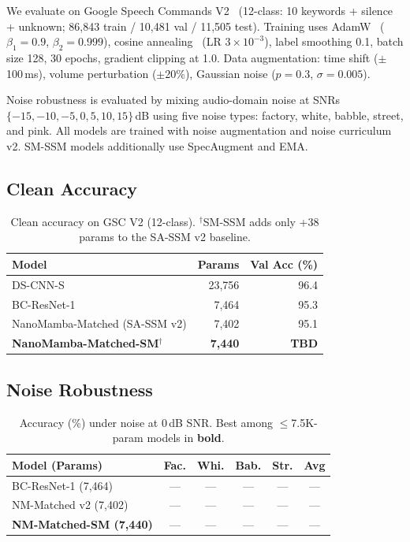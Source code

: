 \documentclass{Interspeech}
\begin{document}
We evaluate on Google Speech Commands V2~\cite{warden2018speech} (12-class: 10 keywords + silence + unknown; 86,843 train / 10,481 val / 11,505 test).
Training uses AdamW~\cite{loshchilov2019adamw} ($\beta_1{=}0.9$, $\beta_2{=}0.999$), cosine annealing~\cite{loshchilov2017sgdr} (LR $3{\times}10^{-3}$), label smoothing 0.1, batch size 128, 30 epochs, gradient clipping at 1.0.
Data augmentation: time shift ($\pm$100\,ms), volume perturbation ($\pm$20\%), Gaussian noise ($p{=}0.3$, $\sigma{=}0.005$).

Noise robustness is evaluated by mixing audio-domain noise at SNRs $\{-15, -10, -5, 0, 5, 10, 15\}$\,dB using five noise types: factory, white, babble, street, and pink.
All models are trained with noise augmentation and noise curriculum v2.
SM-SSM models additionally use SpecAugment and EMA.

\subsection{Clean Accuracy}

\begin{table}[t]
\centering
\caption{Clean accuracy on GSC V2 (12-class). $^\dagger$SM-SSM adds only +38 params to the SA-SSM v2 baseline.}
\label{tab:clean}
\small
\begin{tabular}{lrr}
\toprule
\textbf{Model} & \textbf{Params} & \textbf{Val Acc (\%)} \\
\midrule
DS-CNN-S~\cite{zhang2017hello} & 23,756 & 96.4 \\
BC-ResNet-1~\cite{kim2021bcresnet} & 7,464 & 95.3 \\
\midrule
NanoMamba-Matched (SA-SSM v2) & 7,402 & 95.1 \\
\textbf{NanoMamba-Matched-SM}$^\dagger$ & \textbf{7,440} & \textbf{TBD} \\
\bottomrule
\end{tabular}
\end{table}


\subsection{Noise Robustness}

\begin{table}[t]
\centering
\caption{Accuracy (\%) under noise at 0\,dB SNR. Best among ${\leq}$7.5K-param models in \textbf{bold}.}
\label{tab:noise}
\small
\setlength{\tabcolsep}{3pt}
\begin{tabular}{lccccc}
\toprule
\textbf{Model (Params)} & \textbf{Fac.} & \textbf{Whi.} & \textbf{Bab.} & \textbf{Str.} & \textbf{Avg} \\
\midrule
BC-ResNet-1 (7,464) & --- & --- & --- & --- & --- \\
NM-Matched v2 (7,402) & --- & --- & --- & --- & --- \\
\textbf{NM-Matched-SM (7,440)} & --- & --- & --- & --- & --- \\
\bottomrule
\end{tabular}
\end{table}
\end{document}
